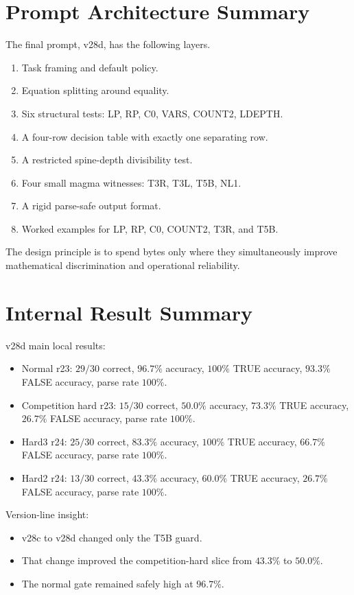 \documentclass[12pt]{amsart}
\begin{document}
\appendix

\section{Prompt Architecture Summary}

The final prompt, v28d, has the following layers.

\begin{enumerate}[label=\arabic*.]
\item Task framing and default policy.
\item Equation splitting around equality.
\item Six structural tests: LP, RP, C0, VARS, COUNT2, LDEPTH.
\item A four-row decision table with exactly one separating row.
\item A restricted spine-depth divisibility test.
\item Four small magma witnesses: T3R, T3L, T5B, NL1.
\item A rigid parse-safe output format.
\item Worked examples for LP, RP, C0, COUNT2, T3R, and T5B.
\end{enumerate}

The design principle is to spend bytes only where they simultaneously improve mathematical discrimination and operational reliability.

\section{Internal Result Summary}

v28d main local results:
\begin{itemize}
\item Normal r23: $29/30$ correct, $96.7\%$ accuracy, $100\%$ TRUE accuracy, $93.3\%$ FALSE accuracy, parse rate $100\%$.
\item Competition hard r23: $15/30$ correct, $50.0\%$ accuracy, $73.3\%$ TRUE accuracy, $26.7\%$ FALSE accuracy, parse rate $100\%$.
\item Hard3 r24: $25/30$ correct, $83.3\%$ accuracy, $100\%$ TRUE accuracy, $66.7\%$ FALSE accuracy, parse rate $100\%$.
\item Hard2 r24: $13/30$ correct, $43.3\%$ accuracy, $60.0\%$ TRUE accuracy, $26.7\%$ FALSE accuracy, parse rate $100\%$.
\end{itemize}

Version-line insight:
\begin{itemize}
\item v28c to v28d changed only the T5B guard.
\item That change improved the competition-hard slice from $43.3\%$ to $50.0\%$.
\item The normal gate remained safely high at $96.7\%$.
\end{itemize}
\end{document}
